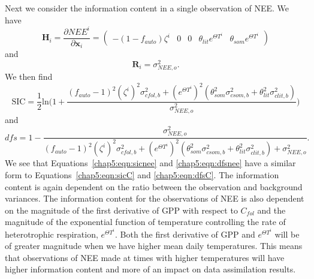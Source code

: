 Next we consider the information content in a single observation of NEE. We have
\begin{equation}
\textbf{H}_{i} = \frac{\partial NEE^{i}}{\partial \textbf{x}_{i}} =
\begin{pmatrix}
-(1-f_{auto})\zeta^i & 0 & 0 & \theta_{lit} e^{\Theta T^{i}} & \theta_{som} e^{\Theta T^{i}}
\end{pmatrix}
\end{equation}
and
\begin{equation}
\mathbf{R}_i = \sigma_{NEE,o}^{2}.
\end{equation}
We then find
\begin{equation}
\text{SIC} = \frac{1}{2}\text{ln}\Bigg(1 + \frac{(f_{auto}-1)^{2}(\zeta^{i})^{2}\sigma_{cfol,b}^{2} + (e^{\Theta T^{i}})^2(\theta_{som}^2\sigma_{csom,b}^2+\theta_{lit}^2\sigma_{clit,b}^2)}{\sigma_{NEE,o}^{2}}\Bigg) \label{chap5:eqn:sicnee}
\end{equation}
and
\begin{equation}
dfs = 1 - \frac{\sigma_{NEE,o}^{2}}{(f_{auto}-1)^{2}(\zeta^{i})^{2}\sigma_{cfol,b}^{2}+(e^{\Theta T^{i}})^2(\theta_{som}^2\sigma_{csom,b}^2+\theta_{lit}^2\sigma_{clit,b}^2) +\sigma_{NEE,o}^{2}}. \label{chap5:eqn:dfsnee}
\end{equation}
We see that Equations~\eqref{chap5:eqn:sicnee} and \eqref{chap5:eqn:dfsnee} have a similar form to Equations~\eqref{chap5:eqn:sicC} and \eqref{chap5:eqn:dfsC}. The information content is again dependent on the ratio between the observation and background variances. The information content for the observations of NEE is also dependent on the magnitude of the first derivative of GPP with respect to \(C_{fol}\) and the magnitude of the exponential function of temperature controlling the rate of heterotrophic respiration, \(e^{\Theta T^{i}}\). Both the first derivative of GPP and  \(e^{\Theta T^{i}}\) will be of greater magnitude when we have higher mean daily temperatures. This means that observations of NEE made at times with higher temperatures will have higher information content and more of an impact on data assimilation results.
